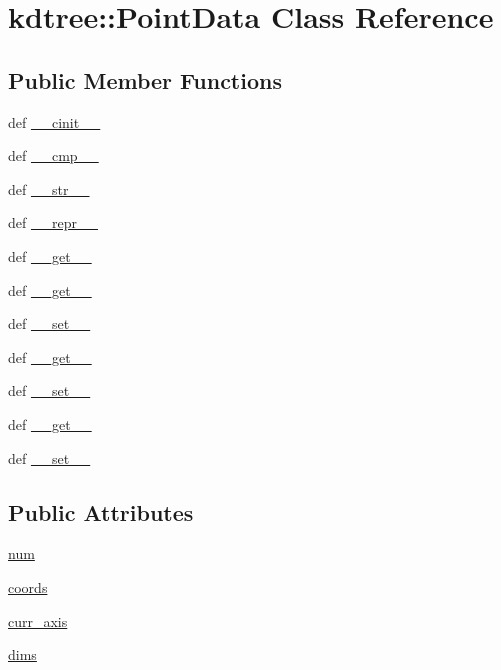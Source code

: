 \hypertarget{classkdtree_1_1PointData}{
\section{kdtree::PointData Class Reference}
\label{classkdtree_1_1PointData}
}
\subsection*{Public Member Functions}
\begin{DoxyCompactItemize}
\item 
def \hyperlink{classkdtree_1_1PointData_a81cadc16da39464cc07f2e8f2e0eb11e}{\_\-\_\-cinit\_\-\_\-}
\item 
def \hyperlink{classkdtree_1_1PointData_a430d24eb45b811759229bd33d0a705e7}{\_\-\_\-cmp\_\-\_\-}
\item 
def \hyperlink{classkdtree_1_1PointData_a1bd852059365e1d18d17d9f81dc6a9b8}{\_\-\_\-str\_\-\_\-}
\item 
def \hyperlink{classkdtree_1_1PointData_a64772819f9e0b27fc161e9072fd58806}{\_\-\_\-repr\_\-\_\-}
\item 
def \hyperlink{classkdtree_1_1PointData_a5000beba86f5112731c5cf9e7243541e}{\_\-\_\-get\_\-\_\-}
\item 
def \hyperlink{classkdtree_1_1PointData_a5000beba86f5112731c5cf9e7243541e}{\_\-\_\-get\_\-\_\-}
\item 
def \hyperlink{classkdtree_1_1PointData_a1f8080905a01c797e4a87153356b8ea6}{\_\-\_\-set\_\-\_\-}
\item 
def \hyperlink{classkdtree_1_1PointData_a5000beba86f5112731c5cf9e7243541e}{\_\-\_\-get\_\-\_\-}
\item 
def \hyperlink{classkdtree_1_1PointData_a1f8080905a01c797e4a87153356b8ea6}{\_\-\_\-set\_\-\_\-}
\item 
def \hyperlink{classkdtree_1_1PointData_a5000beba86f5112731c5cf9e7243541e}{\_\-\_\-get\_\-\_\-}
\item 
def \hyperlink{classkdtree_1_1PointData_a1f8080905a01c797e4a87153356b8ea6}{\_\-\_\-set\_\-\_\-}
\end{DoxyCompactItemize}
\subsection*{Public Attributes}
\begin{DoxyCompactItemize}
\item 
\hyperlink{classkdtree_1_1PointData_aa0f93c69fdf720bec92ee8a758d49014}{num}
\item 
\hyperlink{classkdtree_1_1PointData_ad1370104f57b10805299adb907dda537}{coords}
\item 
\hyperlink{classkdtree_1_1PointData_a662947723bdfd0b087f33e1d3ca7e90e}{curr\_\-axis}
\item 
\hyperlink{classkdtree_1_1PointData_aafa4b0dc31665c15b2c250ef84234b4a}{dims}
\end{DoxyCompactItemize}


